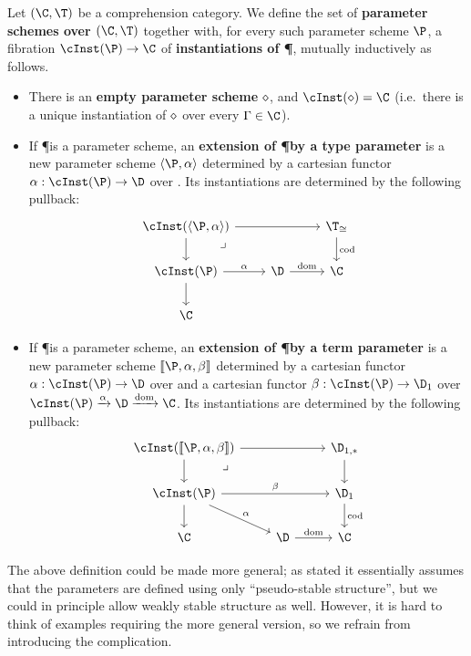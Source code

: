 \begin{enumerate}
\begin{enumerate}
\begin{defn}\label{defn:param-scheme}
  Let $(\C,\T)$ be a comprehension category.
  We define the set of \textbf{parameter schemes over $(\C,\T)$} together with, for every such parameter scheme $\P$, a fibration $\cInst(\P)\to\C$ of \textbf{instantiations of \P}, mutually inductively as follows.
  \begin{itemize}
  \item There is an \textbf{empty parameter scheme} $\diamond$, and $\cInst(\emptyps) = \C$ (i.e.\ there is a unique instantiation of $\diamond$ over every $\Gamma\in\C$).
  \item If \P is a parameter scheme, an \textbf{extension of \P by a type parameter} is a new parameter scheme $\typeps{\P}{\al}$ determined by a cartesian functor $\al:\cInst(\P)\to\D$ over \C.
    Its instantiations are determined by the following pullback:
    \[
    \begin{tikzcd}
      \cInst(\typeps{\P}{\al}) \ar[rr] \ar[d] \pullback{dr} && \T_{\cong} \ar[d,"\mathrm{cod}"] \\
      \cInst(\P) \ar[r,"\al"] \ar[d] & \D \ar[r,"\mathrm{dom}"] & \C\\
      \C
    \end{tikzcd}
    \]
  \item If \P is a parameter scheme, an \textbf{extension of \P by a term parameter} is a new parameter scheme $\termps\P\al\be$ determined by a cartesian functor $\al:\cInst(\P)\to\D$ over \C and a cartesian functor $\be:\cInst(\P) \to \D_1$ over $\cInst(\P) \xto{\al} \D \xto{\mathrm{dom}} \C$.
    Its instantiations are determined by the following pullback:
    \[
    \begin{tikzcd}
      \cInst(\termps{\P}{\al}{\be}) \ar[rr] \ar[d] \pullback{dr} & & \D_{1,*} \ar[d] \\
      \cInst(\P) \ar[dr,"\al"] \ar[d] \ar[rr,"\be"] & \phantom{.} & \D_1 \ar[d,"\mathrm{cod}"]\\
      \C & \D \ar[r,"\mathrm{dom}"] & \C
    \end{tikzcd}
    \]
  \end{itemize}
\end{defn}

\begin{rmk}{}
  The above definition could be made more general; as stated it essentially assumes that the parameters are defined using only ``pseudo-stable structure'', but we could in principle allow weakly stable structure as well.
  However, it is hard to think of examples requiring the more general version, so we refrain from introducing the complication.
\end{rmk}


\end{enumerate}
\end{enumerate}
